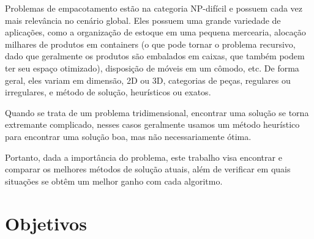 Problemas de empacotamento estão na categoria NP-difícil e possuem cada vez mais relevância no cenário global.
Eles possuem uma grande variedade de aplicações, como a organização de estoque em uma pequena mercearia, alocação milhares de produtos em containers (o que pode tornar o problema recursivo, dado que geralmente os produtos são embalados em caixas, que também podem ter seu espaço otimizado), disposição de móveis em um cômodo, etc.
De forma geral, eles variam em dimensão, 2D ou 3D, categorias de peças, regulares ou irregulares\cite{irregular-pieces}, e método de solução, heurísticos ou exatos.

Quando se trata de um problema tridimensional, encontrar uma solução se torna extremante complicado, nesses casos geralmente usamos um método heurístico para encontrar uma solução boa, mas não necessariamente ótima.

Portanto, dada a importância do problema, este trabalho visa encontrar e comparar os melhores métodos de solução atuais, além de verificar em quais situações se obtêm um melhor ganho com cada algoritmo.

%
%
%

\section{Objetivos}\label{sec:Objetivos}
